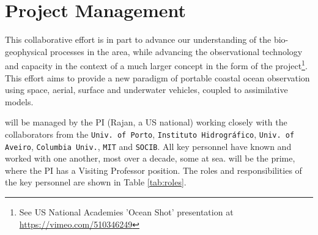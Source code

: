 \section{Project Management}

This collaborative effort is in part to advance our understanding of
the bio-geophysical processes in the \naz area, while advancing the
observational technology and capacity in the context of a much larger
concept in the form of the \met project\footnote{See US National
  Academies 'Ocean Shot' presentation at
  \url{https://vimeo.com/510346249}}. This effort aims to provide a
new paradigm of portable coastal ocean observation using space,
aerial, surface and underwater vehicles, coupled to assimilative
models.

\proj will be managed by the PI (Rajan, a US national) working closely
with the collaborators from the \texttt{Univ. of Porto},
\texttt{Instituto Hidrogr\'{a}fico}, \texttt{Univ. of Aveiro},
\texttt{Columbia Univ.}, \texttt{MIT} and \texttt{SOCIB}.  All key
personnel have known and worked with one another, most over a decade,
some at sea. \univ will be the prime, where the PI has a Visiting
Professor position. The roles and responsibilities of the key
personnel are shown in Table \ref{tab:roles}.

